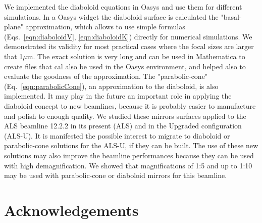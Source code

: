 \documentclass{iucr}              %
\begin{document}
We implemented the diaboloid equations in Oasys and use them for different simulations. In a Oasys widget the diaboloid surface is calculated the "basal-plane" approximation, which allows to use simple formulas (Eqs.~\ref{eqn:diaboloidV}, \ref{eqn:diaboloidK}) directly for numerical simulations. We demonstrated its validity for most practical cases where the focal sizes are larger that 1$\mu$m. 
The exact solution \cite{lacey} is very long and can be used in Mathematica to create files that cal also be used in the Oasys environment, and helped also to evaluate the goodness of the approximation. 
The "parabolic-cone" (Eq.~\ref{eqn:parabolicCone}), an  approximation to the diaboloid, is also implemented. It may play in the future an important role in applying the diaboloid concept to new beamlines, because it is probably easier to manufacture and polish to enough quality. We studied these mirrors surfaces applied to the ALS beamline 12.2.2 in its present (ALS) and in the Upgraded configuration (ALS-U). It is manifested the possible interest to migrate to diaboloid or parabolic-cone solutions for the ALS-U, if they can be built. The use of these new solutions may also improve the beamline performances because they can be used with high demagnification. We showed that magnifications of 1:5 and up to 1:10 may be used with parabolic-cone or diaboloid mirrors for this beamline. 






\section{Acknowledgements}       
 
\end{document}
